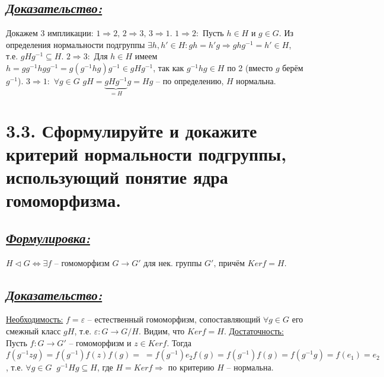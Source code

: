 \documentclass{article}
\begin{document}
\subsection*{\Large \underline{\textit{Доказательство: }}}
Докажем 3 импликации: $1 \Rightarrow 2, \, 2 \Rightarrow 3, \, 3 \Rightarrow 1$.
\newline \indent \underline{$1 \Rightarrow 2:$}
\newline Пусть $h \in H$ и $g \in G$. Из определения нормальности подгруппы 
\newline $\exists h, h' \in H : gh = h'g \Rightarrow ghg^{-1} = h' \in H$, т.е. $gHg^{-1} \subseteq H$. 
\newline \indent \underline{$2 \Rightarrow 3:$}
\newline Для $h \in H$ имеем $h = gg^{-1}hgg^{-1} = g(g^{-1}hg)g^{-1} \in gHg^{-1}$, так как $g^{-1}hg \in H$ по 2 (вместо $g$ берём $g^{-1}$).
\newline \indent \underline{$3 \Rightarrow 1:$}
\newline $\forall g \in G$  $gH = \underbrace{gHg^{-1}}_{= H}g = Hg$ -- по определению, $H$ нормальна.

\section*{\LARGE 3.3. Сформулируйте и докажите критерий нормальности подгруппы, использующий понятие ядра гомоморфизма. }
\subsection*{\Large \underline{\textit{Формулировка: }}}
$H\triangleleft G \Leftrightarrow \exists f \mbox{ -- гомоморфизм } G \rightarrow G' \mbox{ для нек. группы } G',\, \mbox{причём } Kerf = H$. 
\subsection*{\Large \underline{\textit{Доказательство: }}}
$ $\indent \underline{Необходимость:}
\newline $f = \varepsilon$ -- естественный гомоморфизм, сопоставляющий $\forall g \in G$ его смежный класс $gH$, т.е. $\varepsilon: G \rightarrow G / H$. Видим, что $Kerf = H$.
\newline \indent \underline{Достаточность:}
\newline Пусть $f : G \rightarrow G'$ -- гомоморфизм и $z \in Kerf$. Тогда $f(g^{-1}zg) = f(g^{-1})f(z)f(g) = \; = f(g^{-1})e_2f(g) = f(g^{-1})f(g) = f(g^{-1}g) = f(e_1) = e_2$, т.е. $\forall g \in G \;\; g^{-1}Hg \subseteq H$, где $H = Kerf \Rightarrow$ по критерию $H$ -- нормальна.
\end{document}
